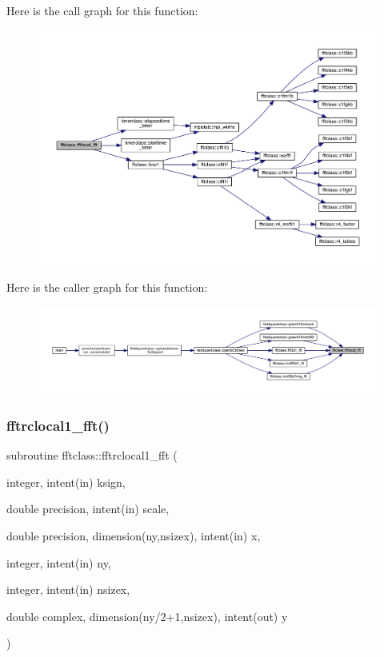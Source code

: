 Here is the call graph for this function\+:\nopagebreak
\begin{figure}[H]
\begin{center}
\leavevmode
\includegraphics[width=350pt]{namespacefftclass_aa64d94b8c8578b384955207a409a2445_cgraph}
\end{center}
\end{figure}
Here is the caller graph for this function\+:\nopagebreak
\begin{figure}[H]
\begin{center}
\leavevmode
\includegraphics[width=350pt]{namespacefftclass_aa64d94b8c8578b384955207a409a2445_icgraph}
\end{center}
\end{figure}
\mbox{\label{namespacefftclass_af33a24fc1bf4d5763c335c0cef247e3c}} 
\subsubsection{\texorpdfstring{fftrclocal1\_fft()}{fftrclocal1\_fft()}}
{\footnotesize\ttfamily subroutine fftclass\+::fftrclocal1\+\_\+fft (\begin{DoxyParamCaption}\item[{integer, intent(in)}]{ksign,  }\item[{double precision, intent(in)}]{scale,  }\item[{double precision, dimension(ny,nsizex), intent(in)}]{x,  }\item[{integer, intent(in)}]{ny,  }\item[{integer, intent(in)}]{nsizex,  }\item[{double complex, dimension(ny/2+1,nsizex), intent(out)}]{y }\end{DoxyParamCaption})}

